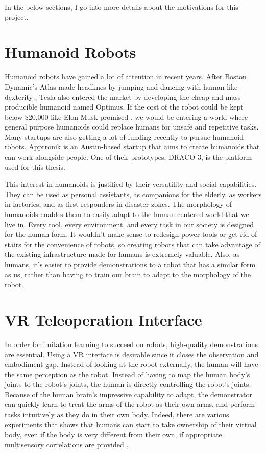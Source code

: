 In the below sections, I go into more details about the motivations for this project.

\section{Humanoid Robots}
Humanoid robots have gained a lot of attention in recent years. After Boston Dynamic's Atlas made headlines by jumping and dancing with human-like dexterity \cite{atlas}, Tesla also entered the market by developing the cheap and mass-producible humanoid named Optimus. If the cost of the robot could be kept below \$20,000 like Elon Musk promised \cite{teslabot}, we would be entering a world where general purpose humanoids could replace humans for unsafe and repetitive tasks. Many startups are also getting a lot of funding recently to pursue humanoid robots. Apptronik is an Austin-based startup that aims to create humanoids that can work alongside people. One of their prototypes, DRACO 3, is the platform used for this thesis.

This interest in humanoids is justified by their versatility and social capabilities. They can be used as personal assistants, as companions for the elderly, as workers in factories, and as first responders in disaster zones. The morphology of humanoids enables them to easily adapt to the human-centered world that we live in. Every tool, every environment, and every task in our society is designed for the human form. It wouldn't make sense to redesign power tools or get rid of stairs for the convenience of robots, so creating robots that can take advantage of the existing infrastructure made for humans is extremely valuable. Also, as humans, it's easier to provide demonstrations to a robot that has a similar form as us, rather than having to train our brain to adapt to the morphology of the robot.

\section {VR Teleoperation Interface}
In order for imitation learning to succeed on robots, high-quality demonstrations are essential. Using a VR interface is desirable since it closes the observation and embodiment gap. Instead of looking at the robot externally, the human will have the same perception as the robot. Instead of having to map the human body's joints to the robot's joints, the human is directly controlling the robot's joints. Because of the human brain's impressive capability to adapt, the demonstrator can quickly learn to treat the arms of the robot as their own arms, and perform tasks intuitively as they do in their own body. Indeed, there are various experiments that shows that humans can start to take ownership of their virtual body, even if the body is very different from their own, if appropriate multisensory correlations are provided \cite{10.3389/fnhum.2015.00141} \cite{10.3389/neuro.09.006.2008}. 

